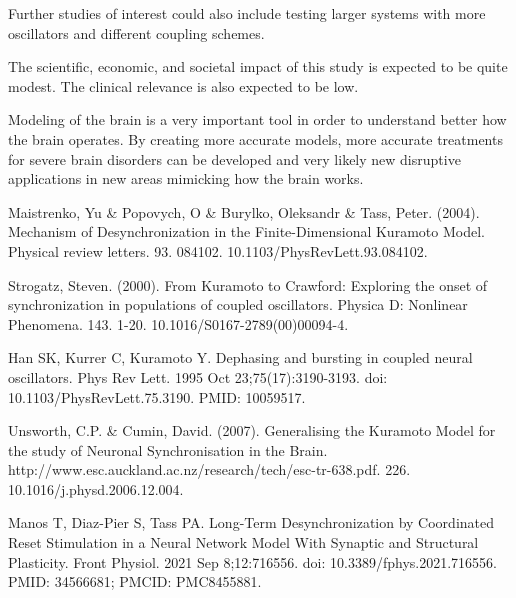\documentclass{article}
\begin{document}
Further studies of interest could also include testing larger systems with more oscillators and different coupling schemes.

The scientific, economic, and societal impact of this study is expected to be quite modest. The clinical relevance is also expected to be low.

Modeling of the brain is a very important tool in order to understand better how the brain operates. By creating more accurate models, more accurate treatments for severe brain disorders can be developed and very likely new disruptive applications in new areas mimicking how the brain works.  


\begin{thebibliography}{9}

Maistrenko, Yu \& Popovych, O \& Burylko, Oleksandr \& Tass, Peter. (2004). Mechanism of Desynchronization in the Finite-Dimensional Kuramoto Model. Physical review letters. 93. 084102. 10.1103/PhysRevLett.93.084102. 

Strogatz, Steven. (2000). From Kuramoto to Crawford: Exploring the onset of synchronization in populations of coupled oscillators. Physica D: Nonlinear Phenomena. 143. 1-20. 10.1016/S0167-2789(00)00094-4. 

Han SK, Kurrer C, Kuramoto Y. Dephasing and bursting in coupled neural oscillators. Phys Rev Lett. 1995 Oct 23;75(17):3190-3193. doi: 10.1103/PhysRevLett.75.3190. PMID: 10059517.

Unsworth, C.P. \& Cumin, David. (2007). Generalising the Kuramoto Model for the study of Neuronal Synchronisation in the Brain. http://www.esc.auckland.ac.nz/research/tech/esc-tr-638.pdf. 226. 10.1016/j.physd.2006.12.004. 

Manos T, Diaz-Pier S, Tass PA. Long-Term Desynchronization by Coordinated Reset Stimulation in a Neural Network Model With Synaptic and Structural Plasticity. Front Physiol. 2021 Sep 8;12:716556. doi: 10.3389/fphys.2021.716556. PMID: 34566681; PMCID: PMC8455881.

\end{thebibliography}
\end{document}
